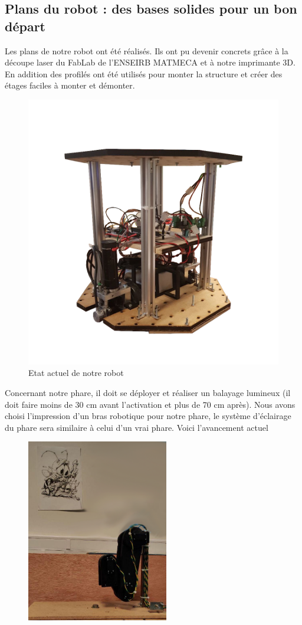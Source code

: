 \documentclass[a4paper,10pt]{article}
\begin{document}
\begin{spacing}{1.5}
\subsection*{Plans du robot : des bases solides pour un bon départ}
Les plans de notre robot ont été réalisés. Ils ont pu devenir concrets grâce à la
découpe laser du FabLab de l'ENSEIRB MATMECA et à notre imprimante 3D. En
addition des profilés ont été utilisés pour monter la structure et créer des
étages faciles à monter et démonter.
\begin{figure}[H]
  \center
  \includegraphics[scale=0.3]{1A2020.png}
  \caption{Etat actuel de notre robot}
\end{figure}
Concernant notre phare, il doit se déployer et réaliser un balayage lumineux (il
doit faire moins de 30 cm avant l'activation et plus de 70 cm après).
Nous avons choisi l'impression d'un bras robotique pour notre phare, le système
d'éclairage du phare sera similaire à celui d'un vrai phare. Voici
l'avancement actuel
\begin{multicols}{2}
\begin{figure}[H]
  \center
  \includegraphics[scale=0.3, height=8cm]{phare_r.png}

\end{figure}
\end{multicols}
\end{spacing}
\end{document}
